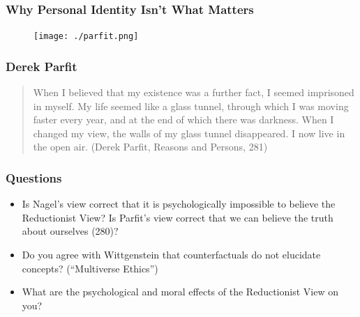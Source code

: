 \documentclass[xcolor=dvipsnames]{beamer}
\begin{document}
\begin{frame}
  \frametitle{Why Personal Identity Isn't What Matters}
  \begin{figure}[h]
    \texttt{[image: ./parfit.png]}
  \end{figure}
\end{frame}

\begin{frame}
  \frametitle{Derek Parfit}
  \begin{quote}
    When I believed that my existence was a further fact, I seemed
    imprisoned in myself. My life seemed like a glass tunnel, through
    which I was moving faster every year, and at the end of which
    there was darkness. When I changed my view, the walls of my glass
    tunnel disappeared. I now live in the open air. (Derek Parfit,
    Reasons and Persons, 281)
  \end{quote}
\end{frame}

\begin{frame}
  \frametitle{Questions}
  \begin{itemize}
  \item Is Nagel's view correct that it is psychologically impossible
    to believe the Reductionist View? Is Parfit's view correct that we
    can believe the truth about ourselves (280)?
  \item Do you agree with Wittgenstein that counterfactuals do not
    elucidate concepts? (``Multiverse Ethics'')
  \item What are the psychological and moral effects of the
    Reductionist View on you?
  \end{itemize}
\end{frame}

\end{document}
